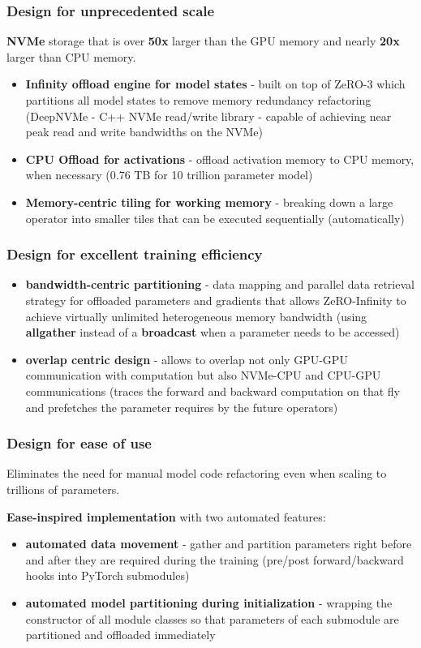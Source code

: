 \documentclass{beamer}
\begin{document}
\begin{frame}
    \frametitle{Design for unprecedented scale}
    \textbf{NVMe} storage that is over \textbf{50x} larger than the GPU memory and nearly \textbf{20x} larger than CPU memory.
    \begin{itemize}
        \item \textbf{Infinity offload engine for model states} - built on top of ZeRO-3 which partitions all model states to remove memory redundancy refactoring (DeepNVMe - C++ NVMe read/write library - capable of achieving near peak read and write bandwidths on the NVMe)
        \item \textbf{CPU Offload for activations} - offload activation memory to CPU memory, when necessary (0.76 TB for 10 trillion parameter model)
        \item \textbf{Memory-centric tiling for working memory} - breaking down a large operator into smaller tiles that can be executed sequentially (automatically)
    \end{itemize}
\end{frame}

\begin{frame}
    \frametitle{Design for excellent training efficiency}
    \begin{itemize}
        \item \textbf{bandwidth-centric partitioning} - data mapping and parallel data retrieval strategy for offloaded parameters and gradients that allows ZeRO-Infinity to achieve virtually unlimited heterogeneous memory bandwidth (using \textbf{allgather} instead of a \textbf{broadcast} when a parameter needs to be accessed)
        \item \textbf{overlap centric design} - allows to overlap not only GPU-GPU communication with computation but also NVMe-CPU and CPU-GPU communications (traces the forward and backward computation on that fly and prefetches the parameter requires by the future operators)
    \end{itemize}
\end{frame}

\begin{frame}
    \frametitle{Design for ease of use}
    Eliminates the need for manual model code refactoring even when scaling to trillions of parameters.

    \textbf{Ease-inspired implementation} with two automated features:
    \begin{itemize}
        \item \textbf{automated data movement} - gather and partition parameters right before and after they are required during the training (pre/post forward/backward hooks into PyTorch submodules)
        \item \textbf{automated model partitioning during initialization} - wrapping the constructor of all module classes so that parameters of each submodule are partitioned and offloaded immediately
    \end{itemize}
\end{frame}
\end{document}
